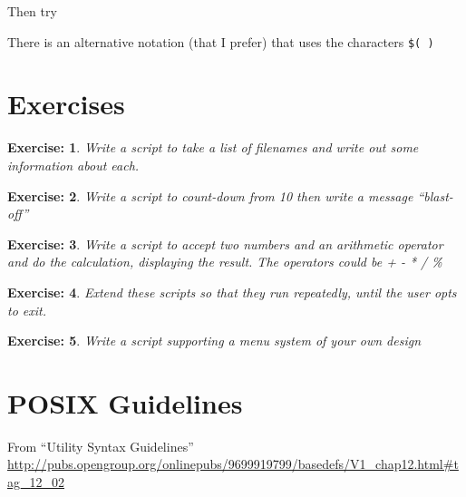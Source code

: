 \documentclass[12pt,a4paper]{article}
\newtheorem{exercise}{Exercise:}
\begin{document}
Then try


There is an alternative notation (that I prefer) that uses the
characters \texttt{\$( )}


\section{Exercises}
\begin{exercise}
  Write a script to take a list of filenames and write out some
  information about each.
\end{exercise}

\begin{exercise}
Write a script to count-down from
10 then write a message ``blast-off''
\end{exercise}

\begin{exercise}
  Write a script to accept two numbers and an arithmetic operator and
  do the calculation, displaying the result. The operators could be +
  - * / \%
\end{exercise}

\begin{exercise}
  Extend these scripts so that they run repeatedly, until the user
  opts to exit.
\end{exercise}

\begin{exercise}
  Write a script supporting a menu system of your own design
\end{exercise}





\appendix
\section{POSIX Guidelines}
From ``Utility Syntax Guidelines''
\url{http://pubs.opengroup.org/onlinepubs/9699919799/basedefs/V1_chap12.html#tag_12_02}
\end{document}
